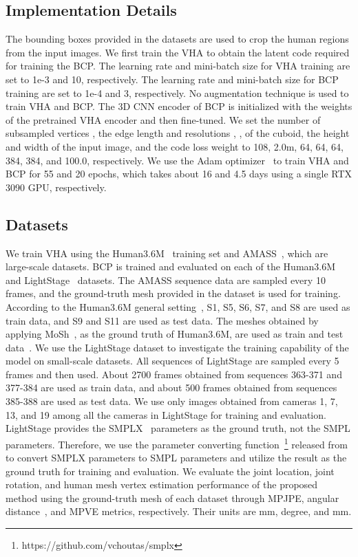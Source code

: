 \documentclass{article}
\begin{document}
\subsection{Implementation Details}
\label{ssec:implementation_details}

The bounding boxes provided in the datasets are used to crop the human regions from the input images. We first train the VHA to obtain the latent code  required for training the BCP. The learning rate and mini-batch size for VHA training are set to 1e-3 and 10, respectively. The learning rate and mini-batch size for BCP training are set to 1e-4 and 3, respectively. No augmentation technique is used to train VHA and BCP. The 3D CNN encoder of BCP is initialized with the weights of the pretrained VHA encoder and then fine-tuned. We set the number of subsampled vertices , the edge length  and resolutions , ,  of the cuboid, the height  and width  of the input image, and the code loss weight  to 108, 2.0m, 64, 64, 64, 384, 384, and 100.0, respectively. We use the Adam optimizer~\cite{2015_Kingma} to train VHA and BCP for 55 and 20 epochs, which takes about 16 and 4.5 days using a single RTX 3090 GPU, respectively.


\subsection{Datasets}
\label{ssec:datasets}

We train VHA using the Human3.6M~\cite{2014_H36M} training set and AMASS~\cite{moshpp_AMASS_2019}, which are large-scale datasets. BCP is trained and evaluated on each of the Human3.6M and LightStage~\cite{peng2021neural} datasets. The AMASS sequence data are sampled every 10 frames, and the ground-truth mesh provided in the dataset is used for training. According to the Human3.6M general setting~\cite{2018_Kanazawa, 2019_LT, Chun_2023_WACV, 2020_Shin, choi2022learning}, S1, S5, S6, S7, and S8 are used as train data, and S9 and S11 are used as test data. The meshes obtained by applying MoSh~\cite{mosh_Loper_2014}, as the ground truth of Human3.6M, are used as train and test data~\cite{Chun_2023_WACV}. We use the LightStage dataset to investigate the training capability of the model on small-scale datasets. All sequences of LightStage are sampled every 5 frames and then used. About 2700 frames obtained from sequences 363-371 and 377-384 are used as train data, and about 500 frames obtained from sequences 385-388 are used as test data. We use only images obtained from cameras 1, 7, 13, and 19 among all the cameras in LightStage for training and evaluation. LightStage provides the SMPLX~\cite{SMPLify_X_2019_Pavlakos} parameters as the ground truth, not the SMPL parameters. Therefore, we use the parameter converting function~\footnote{https://github.com/vchoutas/smplx} released from~\cite{SMPLify_X_2019_Pavlakos} to convert SMPLX parameters to SMPL parameters and utilize the result as the ground truth for training and evaluation. We evaluate the joint location, joint rotation, and human mesh vertex estimation performance of the proposed method using the ground-truth mesh of each dataset through MPJPE, angular distance~\cite{Hartley_IJCV2013}, and MPVE metrics, respectively. Their units are mm, degree, and mm.
\end{document}
